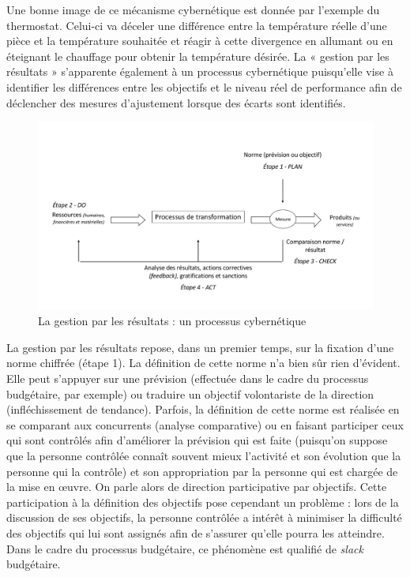 \documentclass{tufte-handout}
\begin{document}
\begin{enumerate}
Une bonne image de ce mécanisme cybernétique est donnée par l’exemple du thermostat. Celui-ci va déceler une différence entre la température réelle d’une pièce et la température souhaitée et réagir à cette divergence en allumant ou en éteignant le chauffage pour obtenir la température désirée. La « gestion par les résultats » s’apparente également à un processus cybernétique puisqu’elle vise à identifier les différences entre les objectifs et le niveau réel de performance afin de déclencher des mesures d’ajustement lorsque des écarts sont identifiés.\\
\begin{figure}[htbp]
\centering
\includegraphics[width=.9\linewidth]{./img/gestionobj.pdf}
\caption{La gestion par les résultats : un processus cybernétique}
\end{figure}
La gestion par les résultats repose, dans un premier temps, sur la fixation d’une norme chiffrée (étape 1). La définition de cette norme n’a bien sûr rien d’évident. Elle peut s’appuyer sur une prévision (effectuée dans le cadre du processus budgétaire, par exemple) ou traduire un objectif volontariste de la direction (infléchissement de tendance). Parfois, la définition de cette norme est réalisée en se comparant aux concurrents (analyse comparative) ou en faisant participer ceux qui sont contrôlés afin d’améliorer la prévision qui est faite (puisqu’on suppose que la personne contrôlée connaît souvent mieux l’activité et son évolution que la personne qui la contrôle) et son appropriation par la personne qui est chargée de la mise en œuvre. On parle alors de direction participative par objectifs. Cette participation à la définition des objectifs pose cependant un problème : lors de la discussion de ses objectifs, la personne contrôlée a intérêt à minimiser la difficulté des objectifs qui lui sont assignés afin de s’assurer qu’elle pourra les atteindre. Dans le cadre du processus budgétaire, ce phénomène est qualifié de \emph{slack} budgétaire.\\

\end{enumerate}
\end{document}
